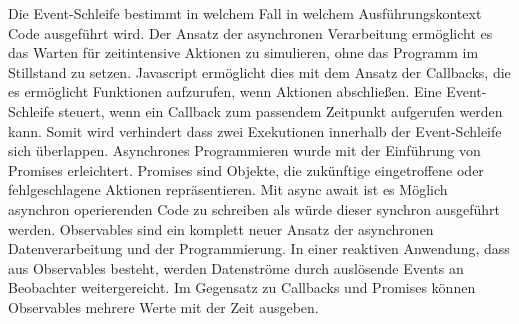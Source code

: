 \noindent
Die Event-Schleife bestimmt in welchem Fall in welchem Ausführungskontext Code ausgeführt wird. Der Ansatz der asynchronen Verarbeitung ermöglicht es das Warten für zeitintensive Aktionen zu simulieren, ohne das Programm im Stillstand zu setzen. Javascript ermöglicht dies mit dem Ansatz der Callbacks, die es ermöglicht Funktionen aufzurufen, wenn Aktionen abschließen. Eine Event-Schleife steuert, wenn ein Callback zum passendem Zeitpunkt aufgerufen werden kann. Somit wird verhindert dass zwei Exekutionen innerhalb der Event-Schleife sich überlappen. Asynchrones Programmieren wurde mit der Einführung von Promises erleichtert. Promises sind Objekte, die zukünftige eingetroffene oder fehlgeschlagene Aktionen repräsentieren. Mit async await ist es Möglich asynchron operierenden Code zu schreiben als würde dieser synchron ausgeführt werden. Observables sind ein komplett neuer Ansatz der asynchronen Datenverarbeitung und der Programmierung. In einer reaktiven Anwendung, dass aus Observables besteht, werden Datenströme durch auslösende Events an Beobachter weitergereicht. Im Gegensatz zu Callbacks und Promises können Observables mehrere Werte mit der Zeit ausgeben.